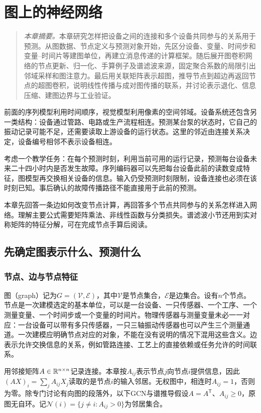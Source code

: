\chapter{图上的神经网络}
\label{chap:graph-neural-networks}
\begin{quote}\small
\textit{本章摘要。}本章研究怎样把设备之间的连接和多个设备共同参与的关系用于预测。从图数据、节点定义与预测对象开始，先区分设备、变量、时间步和变量--时间片等建图单位，再建立消息传递的计算框架。随后展开图卷积网络的节点更新、归一化、手算例子及谱滤波来源，固定聚合系数的局限引出邻域采样和图注意力。最后用关联矩阵表示超图，推导节点到超边再返回节点的超图卷积，说明线性传播与成对图传播的联系，并讨论表示退化、信息压缩、建图边界与工业验证。
\end{quote}

前面的序列模型利用时间顺序，视觉模型利用像素的空间邻域。设备系统还包含另一类结构：设备通过管路、电路或生产流程相连。预测某台泵的状态时，它自己的振动记录可能不足，还需要读取上游设备的运行状态。这里的邻近由连接关系决定，设备编号相邻不表示设备相连。

考虑一个教学任务：在每个预测时刻，利用当前可用的运行记录，预测每台设备未来二十四小时内是否发生故障。序列编码器可以先把每台设备此前的读数变成特征，图模型再交换相关设备的信息。输入仍受预测时刻限制，设备连接也必须在该时刻已知。事后确认的故障传播路径不能直接用于此前的预测。

本章先回答一条边如何改变节点计算，再回答多个节点共同参与的关系怎样进入网络。理解主要公式需要矩阵乘法、非线性函数与分类损失。谱滤波小节还用到实对称矩阵的特征分解，可在完成节点手算后阅读。

\section{先确定图表示什么、预测什么}
\subsection{节点、边与节点特征}
图（graph）记为$G=(\mathcal V,\mathcal E)$，其中$\mathcal V$是节点集合，$\mathcal E$是边集合。设有$n$个节点。节点是一次建模选定的基本单位，可以是一台设备、一只传感器、一个工序、一个测量变量、一个时间步或一个变量的时间片。物理传感器与测量变量未必一一对应：一台设备可以带有多只传感器，一只三轴振动传感器也可以产生三个测量通道。一次建模应明确节点对应的对象，不能在没有说明的情况下混用这些含义。边表示允许交换信息的关系，例如管路连接、工艺上的直接依赖或任务允许的时间联系。

用邻接矩阵$A\in\mathbb{R}^{n\times n}$记录连接。本章按$A_{ij}$表示节点$j$向节点$i$提供信息，因此$(AX)_i=\sum_j A_{ij}X_j$读取的是节点$i$的输入邻居。无权图中，相连时$A_{ij}=1$，否则为零。除专门讨论有向图的段落外，以下GCN与谱推导假设$A=A^{\mathsf T}$、$A_{ij}\geq0$，原图无自环。记$\mathcal N(i)=\{j\ne i:A_{ij}>0\}$为邻居集合。

